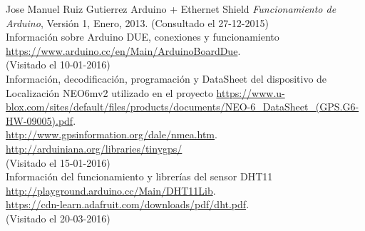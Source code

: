 \begin{thebibliography}{10}




Jose Manuel Ruiz Gutierrez
\newblock Arduino + Ethernet Shield
\newblock \textit{Funcionamiento de Arduino}, Versión 1, Enero, 2013.
\newblock (Consultado el 27-12-2015) \\


Información sobre Arduino DUE, conexiones y funcionamiento
\url{https://www.arduino.cc/en/Main/ArduinoBoardDue}.\\
\newblock (Visitado el 10-01-2016) \\

Información, decodificación, programación y DataSheet del dispositivo de Localización NEO6mv2 utilizado en el proyecto
\url{https://www.u-blox.com/sites/default/files/products/documents/NEO-6_DataSheet_(GPS.G6-HW-09005).pdf}.\\
\url{http://www.gpsinformation.org/dale/nmea.htm}.\\
\url{http://arduiniana.org/libraries/tinygps/}\\
\newblock (Visitado el 15-01-2016) \\

Información del funcionamiento y librerías del sensor DHT11
\url{http://playground.arduino.cc/Main/DHT11Lib}.\\
\url{https://cdn-learn.adafruit.com/downloads/pdf/dht.pdf}.\\
\newblock (Visitado el 20-03-2016) \\


\end{thebibliography}
